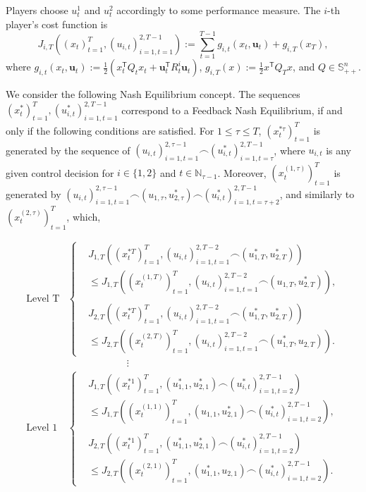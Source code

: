 \documentclass[letterpaper, 10 pt, conference]{ieeeconf}  %
\newcommand{\transpose}{\mathsf{T}}
\begin{document}
Players choose $u_{t}^{1}$ and $u_{t}^{2}$ accordingly to some performance measure.
The $i$-th player's cost function is
\begin{equation}\label{eq:LQcost}
    J_{i,T}((x_{t})_{t=1}^{T},(u_{i,t})_{i=1,t=1}^{2,T-1}) := \sum_{t=1}^{T-1} g_{i,t}(x_{t}, \mathbf{u}_{t}) + g_{i,T}(x_{T}),
\end{equation}
where $g_{i,t}(x_{t}, \mathbf{u}_{t}) := \frac{1}{2}(x_{t}^{\mathsf{T}}Q_{t}x_{t} + 
    \mathbf{u}_{t}^{\transpose}R_{t}^{i}\mathbf{u}_{t})$,
    $g_{i,T}(x) := \frac{1}{2} x^{\mathsf{T}}Q_{T}x$, and $Q\in\mathbb{S}_{++}^n$.

We consider the following Nash Equilibrium concept.
The sequences $(x_{t}^{*})_{t=1}^{T},(u_{i,t}^{*})_{i=1,t=1}^{2,T-1}$ correspond to a Feedback Nash Equilibrium, if and only if the following conditions are satisfied. For $1 \leq \tau \leq T$, $(x_{t}^{*\tau})_{t=1}^{T}$ is generated by the sequence of $(u_{i,t})_{i=1,t=1}^{2,\tau-1} \frown (u_{i,t}^{*})_{i=1,t=\tau}^{2,T-1}$, where $u_{i,t}$ is any given control decision for $i \in \{ 1,2\}$ and $t \in \mathbb{N}_{\tau-1}$. Moreover, $(x_{t}^{(1,\tau)})_{t=1}^{T}$ is generated by $(u_{i,t})_{i=1,t=1}^{2,\tau-1} \frown (u_{1,\tau},u_{2,\tau}^{*}) \frown (u_{i,t}^{*})_{i=1,t=\tau+2}^{2,T-1}$, and similarly to $(x_{t}^{(2,\tau)})_{t=1}^{T}$, which,


\begin{equation}\label{eq:nashIneq}
    \begin{split}
        \text{Level T}
        &\begin{cases}
            &J_{1,T}((x_{t}^{*T})_{t=1}^{T}, (u_{i,t})_{i=1,t=1}^{2,T-2} \frown (u_{1,T}^{*},u_{2,T}^{*})) \\ & \leq J_{1,T}((x_{t}^{(1,T)})_{t=1}^{T}, (u_{i,t})_{i=1,t=1}^{2,T-2} \frown (u_{1,T},u_{2,T}^{*})),\\ \\
            &J_{2,T}((x_{t}^{*T})_{t=1}^{T}, (u_{i,t})_{i=1,t=1}^{2,T-2} \frown (u_{1,T}^{*},u_{2,T}^{*})) \\ & \leq J_{2,T}((x_{t}^{(2,T)})_{t=1}^{T}, (u_{i,t})_{i=1,t=1}^{2,T-2} \frown (u_{1,T}^{*},u_{2,T})).
        \end{cases}
    \\ &\qquad \qquad \qquad \vdots \\
    \text{Level 1}
        &\begin{cases}
            &J_{1,T}((x_{t}^{*1})_{t=1}^{T}, (u_{1,1}^{*},u_{2,1}^{*}) \frown (u_{i,t}^{*})_{i=1,t=2}^{2,T-1}) \\ & \leq J_{1,T}((x_{t}^{(1,1)})_{t=1}^{T}, (u_{1,1},u_{2,1}^{*}) \frown (u_{i,t}^{*})_{i=1,t=2}^{2,T-1}),\\ \\
            &J_{2,T}((x_{t}^{*1})_{t=1}^{T}, (u_{1,1}^{*},u_{2,1}^{*}) \frown (u_{i,t}^{*})_{i=1,t=2}^{2,T-1}) \\ & \leq J_{2,T}((x_{t}^{(2,1)})_{t=1}^{T}, (u_{1,1}^{*},u_{2,1}) \frown (u_{i,t}^{*})_{i=1,t=2}^{2,T-1}).
        \end{cases}
    \end{split}
\end{equation}
\end{document}
